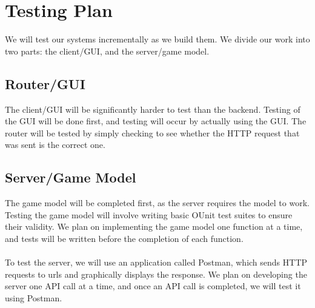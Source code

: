 \documentclass{article}
\begin{document}
    \section{Testing Plan}
    We will test our systems incrementally as we build them. We divide our work into two parts: the client/GUI, and the server/game model.
    
    \subsection{Router/GUI}
    The client/GUI will be significantly harder to test than the backend. Testing of the GUI will be done first, and testing will occur by actually using the GUI. The router will be tested by simply checking to see whether the HTTP request that was sent is the correct one.
    
    \subsection{Server/Game Model}
    The game model will be completed first, as the server requires the model to work. Testing the game model will involve writing basic OUnit test suites to ensure their validity. We plan on implementing the game model one function at a time, and tests will be written before the completion of each function. \\
    \\
    To test the server, we will use an application called Postman, which sends HTTP requests to urls and graphically displays the response. We plan on developing the server one API call at a time, and once an API call is completed, we will test it using Postman.


	
\end{document}
